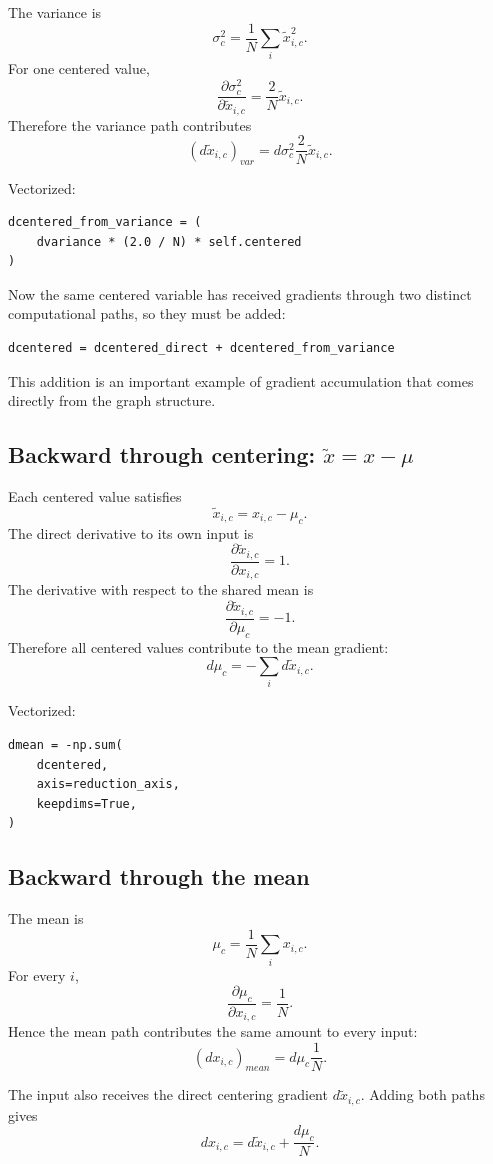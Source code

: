 \documentclass[11pt,a4paper]{article}
\newcommand{\pd}[2]{\frac{\partial #1}{\partial #2}}
\begin{document}
The variance is
\[
\sigma_c^2
=
\frac{1}{N}\sum_i\tilde{x}_{i,c}^2.
\]
For one centered value,
\[
\pd{\sigma_c^2}{\tilde{x}_{i,c}}
=
\frac{2}{N}\tilde{x}_{i,c}.
\]
Therefore the variance path contributes
\[
\boxed{
\left(d\tilde{x}_{i,c}\right)_{var}
=
d\sigma_c^2\frac{2}{N}\tilde{x}_{i,c}
}.
\]

Vectorized:
\begin{lstlisting}
dcentered_from_variance = (
    dvariance * (2.0 / N) * self.centered
)
\end{lstlisting}

Now the same centered variable has received gradients through two distinct computational paths, so they must be added:
\begin{lstlisting}
dcentered = dcentered_direct + dcentered_from_variance
\end{lstlisting}

This addition is an important example of gradient accumulation that comes directly from the graph structure.

\subsection{Backward through centering: $\tilde{x}=x-\mu$}

Each centered value satisfies
\[
\tilde{x}_{i,c}=x_{i,c}-\mu_c.
\]
The direct derivative to its own input is
\[
\pd{\tilde{x}_{i,c}}{x_{i,c}}=1.
\]
The derivative with respect to the shared mean is
\[
\pd{\tilde{x}_{i,c}}{\mu_c}=-1.
\]
Therefore all centered values contribute to the mean gradient:
\[
\boxed{
d\mu_c=-\sum_i d\tilde{x}_{i,c}}.
\]

Vectorized:
\begin{lstlisting}
dmean = -np.sum(
    dcentered,
    axis=reduction_axis,
    keepdims=True,
)
\end{lstlisting}

\subsection{Backward through the mean}

The mean is
\[
\mu_c=\frac{1}{N}\sum_i x_{i,c}.
\]
For every $i$,
\[
\pd{\mu_c}{x_{i,c}}=\frac{1}{N}.
\]
Hence the mean path contributes the same amount to every input:
\[
\left(dx_{i,c}\right)_{mean}=d\mu_c\frac{1}{N}.
\]

The input also receives the direct centering gradient $d\tilde{x}_{i,c}$. Adding both paths gives
\[
\boxed{
dx_{i,c}=d\tilde{x}_{i,c}+\frac{d\mu_c}{N}}.
\]
\end{document}
